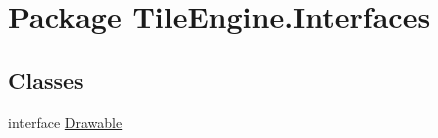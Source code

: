 \hypertarget{namespace_tile_engine_1_1_interfaces}{\section{Package Tile\-Engine.\-Interfaces}
\label{d3/d84/namespace_tile_engine_1_1_interfaces}
}
\subsection*{Classes}
\begin{DoxyCompactItemize}
\item 
interface \hyperlink{interface_tile_engine_1_1_interfaces_1_1_drawable}{Drawable}
\end{DoxyCompactItemize}
